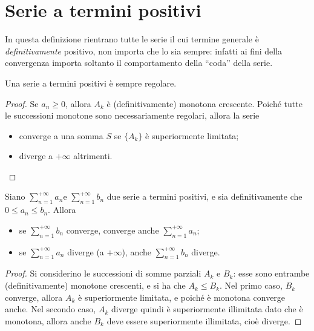 \section{Serie a termini positivi}
In questa definizione rientrano tutte le serie il cui termine generale è \emph{definitivamente} positivo, non importa che lo sia sempre: infatti ai fini della convergenza importa soltanto il comportamento della ``coda'' della serie.
\begin{teorema}
Una serie a termini positivi è sempre regolare.
\end{teorema}
\begin{proof}
Se $a_n\geq 0$, allora $A_k$ è (definitivamente) monotona crescente. Poiché tutte le successioni monotone sono necessariamente regolari, allora la serie
\begin{itemize}
\item converge a una somma $S$ se $\{A_k\}$ è superiormente limitata;
\item diverge a $+\infty$ altrimenti.\qedhere
\end{itemize}
\end{proof}
\begin{teorema}
\label{t:confronto_serie}
Siano $\sum_{n=1}^{+\infty}a_n$e $\sum_{n=1}^{+\infty}b_n$ due serie a termini positivi, e sia definitivamente che $0\leq a_n\leq b_n$. Allora
\begin{itemize}
\item se $\sum_{n=1}^{+\infty}b_n$ converge, converge anche $\sum_{n=1}^{+\infty}a_n$;
\item se $\sum_{n=1}^{+\infty}a_n$ diverge (a $+\infty$), anche $\sum_{n=1}^{+\infty}b_n$ diverge.
\end{itemize}
\end{teorema}
\begin{proof}
Si considerino le successioni di somme parziali $A_k$ e $B_k$: esse sono entrambe (definitivamente) monotone crescenti, e si ha che $A_k\leq B_k$. Nel primo caso, $B_k$ converge, allora $A_k$ è superiormente limitata, e poiché è monotona converge anche.
Nel secondo caso, $A_k$ diverge quindi è superiormente illimitata dato che è monotona, allora anche $B_k$ deve essere superiormente illimitata, cioè diverge.
\end{proof}
